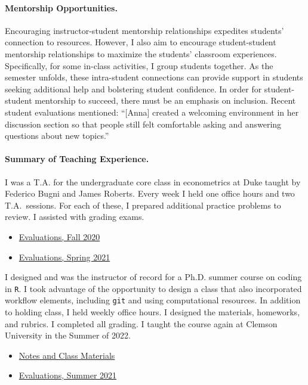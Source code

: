 \paragraph{Mentorship Opportunities.} Encouraging instructor-student mentorship relationships expedites students' connection to resources. However, I also aim to encourage student-student mentorship relationships to maximize the students' classroom experiences. Specifically, for some in-class activities, I group students together. As the semester unfolds, these intra-student connections can provide support in students seeking additional help and bolstering student confidence. In order for student-student mentorship to succeed, there must be an emphasis on inclusion. Recent student evaluations mentioned: ``[Anna] created a welcoming environment in her discussion section so that people still felt comfortable asking and answering questions about new topics.'' 


\paragraph{Summary of Teaching Experience.}

I was a T.A. for the undergraduate core class in econometrics at Duke taught by Federico Bugni and James Roberts. Every week I held one office hours and two T.A.\ sessions. For each of these, I prepared additional practice problems to review. I assisted with grading exams. 
\begin{itemize}
    \item \href{https://www.dropbox.com/s/kzoov8nko2mhg5t/Ziff_Anna_Econ%20104.pdf?dl=0}{Evaluations, Fall 2020}
    \item \href{https://www.dropbox.com/s/kjijwsarvrrdj5s/Ziff_Anna_Econ%20204.pdf?dl=0}{Evaluations, Spring 2021}
\end{itemize}

I designed and was the instructor of record for a Ph.D. summer course on coding in \texttt{R}. I took advantage of the opportunity to design a class that also incorporated workflow elements, including \texttt{git} and using computational resources. In addition to holding class, I held weekly office hours. I designed the materials, homeworks, and rubrics. I completed all grading. I taught the course again at Clemson University in the Summer of 2022.

\begin{itemize}
    \item \href{https://github.com/aziff/R-Workflow-for-Economists}{Notes and Class Materials}
    \item \href{https://www.dropbox.com/s/f8fystdpnxc6don/Ziff_Anna_Econ%20890.pdf?dl=0}{Evaluations, Summer 2021}
\end{itemize}

